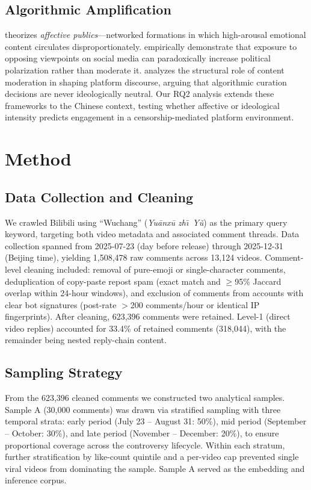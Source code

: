 \documentclass[man, 12pt, mask, floatsintext]{apa7}
\begin{document}
\subsection{Algorithmic Amplification}
\textcite{papacharissi2015} theorizes \textit{affective publics}---networked formations in which high-arousal emotional content circulates disproportionately. \textcite{bail2018} empirically demonstrate that exposure to opposing viewpoints on social media can paradoxically increase political polarization rather than moderate it. \textcite{gillespie2018} analyzes the structural role of content moderation in shaping platform discourse, arguing that algorithmic curation decisions are never ideologically neutral. Our RQ2 analysis extends these frameworks to the Chinese context, testing whether affective or ideological intensity predicts engagement in a censorship-mediated platform environment.

\section{Method}

\subsection{Data Collection and Cleaning}
We crawled Bilibili using ``Wuchang'' (\textit{Yu\={a}nx\={u} zh\=\i\ Y\v{u}}) as the primary query keyword, targeting both video metadata and associated comment threads. Data collection spanned from 2025-07-23 (day before release) through 2025-12-31 (Beijing time), yielding 1,508,478 raw comments across 13,124 videos. Comment-level cleaning included: removal of pure-emoji or single-character comments, deduplication of copy-paste repost spam (exact match and $\geq$95\% Jaccard overlap within 24-hour windows), and exclusion of comments from accounts with clear bot signatures (post-rate $>$200 comments/hour or identical IP fingerprints). After cleaning, 623,396 comments were retained. Level-1 (direct video replies) accounted for 33.4\% of retained comments (318,044), with the remainder being nested reply-chain content.

\subsection{Sampling Strategy}
From the 623,396 cleaned comments we constructed two analytical samples. Sample A (30,000 comments) was drawn via stratified sampling with three temporal strata: early period (July 23 -- August 31: 50\%), mid period (September -- October: 30\%), and late period (November -- December: 20\%), to ensure proportional coverage across the controversy lifecycle. Within each stratum, further stratification by like-count quintile and a per-video cap prevented single viral videos from dominating the sample. Sample A served as the embedding and inference corpus.
\end{document}
